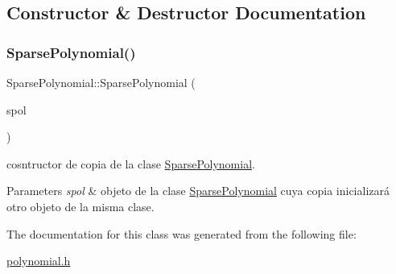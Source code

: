 \subsection{Constructor \& Destructor Documentation}
\mbox{\label{classSparsePolynomial_a609fb9d718a02bcce423c08c1941a247}} 
\subsubsection{\texorpdfstring{Sparse\+Polynomial()}{SparsePolynomial()}}
{\footnotesize\ttfamily Sparse\+Polynomial\+::\+Sparse\+Polynomial (\begin{DoxyParamCaption}\item[{const \hyperlink{classSparsePolynomial}{Sparse\+Polynomial} \&}]{spol }\end{DoxyParamCaption})}



cosntructor de copia de la clase \hyperlink{classSparsePolynomial}{Sparse\+Polynomial}. 


\begin{DoxyParams}{Parameters}
{\em spol} & objeto de la clase \hyperlink{classSparsePolynomial}{Sparse\+Polynomial} cuya copia inicializará otro objeto de la misma clase. \\
\hline
\end{DoxyParams}


The documentation for this class was generated from the following file\+:\begin{DoxyCompactItemize}
\item 
\hyperlink{polynomial_8h}{polynomial.\+h}\end{DoxyCompactItemize}
